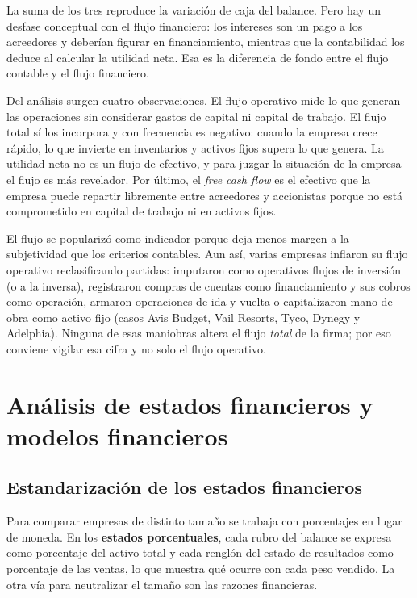 La suma de los tres reproduce la variación de caja del balance. Pero hay un desfase conceptual con el flujo financiero: los intereses son un pago a los acreedores y deberían figurar en financiamiento, mientras que la contabilidad los deduce al calcular la utilidad neta. Esa es la diferencia de fondo entre el flujo contable y el flujo financiero.

Del análisis surgen cuatro observaciones. El flujo operativo mide lo que generan las operaciones sin considerar gastos de capital ni capital de trabajo. El flujo total sí los incorpora y con frecuencia es negativo: cuando la empresa crece rápido, lo que invierte en inventarios y activos fijos supera lo que genera. La utilidad neta no es un flujo de efectivo, y para juzgar la situación de la empresa el flujo es más revelador. Por último, el \emph{free cash flow} es el efectivo que la empresa puede repartir libremente entre acreedores y accionistas porque no está comprometido en capital de trabajo ni en activos fijos.

El flujo se popularizó como indicador porque deja menos margen a la subjetividad que los criterios contables. Aun así, varias empresas inflaron su flujo operativo reclasificando partidas: imputaron como operativos flujos de inversión (o a la inversa), registraron compras de cuentas como financiamiento y sus cobros como operación, armaron operaciones de ida y vuelta o capitalizaron mano de obra como activo fijo (casos Avis Budget, Vail Resorts, Tyco, Dynegy y Adelphia). Ninguna de esas maniobras altera el flujo \emph{total} de la firma; por eso conviene vigilar esa cifra y no solo el flujo operativo.

\section{Análisis de estados financieros y modelos financieros}\label{sec:u2-analisis}

\subsection{Estandarización de los estados financieros}

Para comparar empresas de distinto tamaño se trabaja con porcentajes en lugar de moneda. En los \textbf{estados porcentuales}, cada rubro del balance se expresa como porcentaje del activo total y cada renglón del estado de resultados como porcentaje de las ventas, lo que muestra qué ocurre con cada peso vendido. La otra vía para neutralizar el tamaño son las razones financieras.

